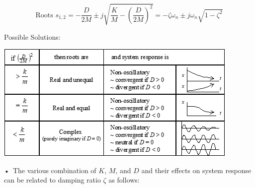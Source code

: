 \documentclass[
]{book}
\begin{document}
\[\text{Roots } s_{1,2} = -\frac{D}{2M} \pm j \sqrt{\frac{K}{M} - \left( \frac{D}{2M} \right)^2} = -\zeta \omega_n \pm j\omega_n\sqrt{1 - \zeta^2} \]

Possible Solutions:

\includegraphics{media/08/image47.png}

•~The various combination of \(K\), \(M\), and \(D\) and their effects on system response can be related to damping ratio \(\zeta\) as follows:
\end{document}
